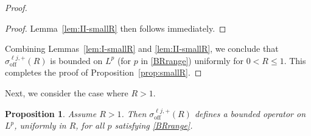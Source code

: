 \documentclass[12pt]{amsart}
\newtheorem{proposition}[theorem]{Proposition}
\begin{document}
\begin{proof}
\begin{proof}
Lemma~\ref{lem:II-smallR} then follows immediately. 

\end{proof}










Combining Lemmas~\ref{lem:I-smallR} and \ref{lem:II-smallR}, we conclude that $\sigma_{\mathrm{off}}^{\ell j,+}(R)$ is bounded on $L^p$ (for $p$ in \eqref{BRrange}) uniformly for $0<R\le 1$. This completes the proof of Proposition~\ref{prop:smallR}.
\end{proof}




Next, we consider the case where $R>1$.


\begin{proposition}\label{prop:largeR}
Assume \(R>1\). Then $\sigma_{\mathrm{off}}^{ \ell j,+}(R)$ defines a bounded operator on $L^p$, uniformly in $R$, for all $p$ satisfying \eqref{BRrange}.
\end{proposition}
\end{document}
